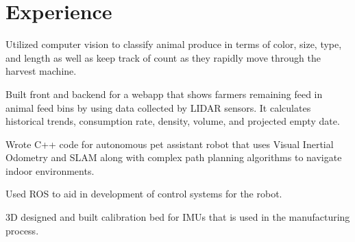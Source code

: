 \documentclass[]{deedy-resume-openfont}
\begin{document}
\hfill
\begin{minipage}[t]{0.66\textwidth} 


\section{Experience}
\sectionsep

\vspace{\topsep} %
\begin{tightemize}
\item Utilized computer vision to classify animal produce in terms of color, size, type, and length as well as keep track of count as they rapidly move through the harvest machine.
\item Built front and backend for a webapp that shows farmers remaining feed in animal feed bins by using data collected by LIDAR sensors. It calculates historical trends, consumption rate, density, volume, and projected empty date.
\end{tightemize}
\sectionsep

\begin{tightemize}
\item Wrote C++ code for autonomous pet assistant robot that uses Visual Inertial Odometry and SLAM along with complex path planning algorithms to navigate indoor environments.
\item Used ROS to aid in development of control systems for the robot.
\item 3D designed and built calibration bed for IMUs that is used in the manufacturing process.
\end{tightemize}
\sectionsep


\end{minipage}
\end{document}
